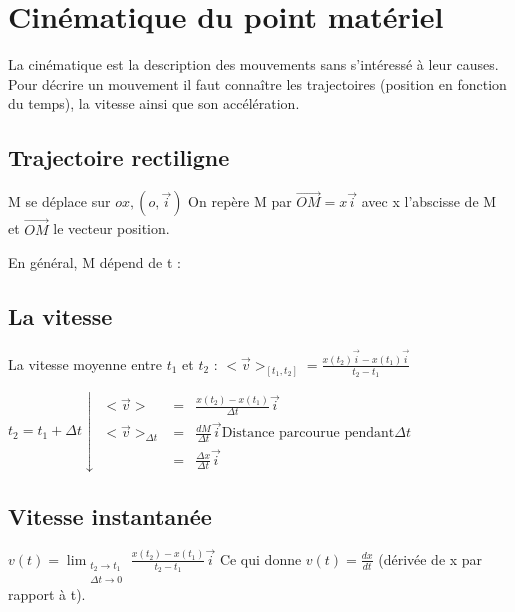 \chapter{Cinématique du point matériel}

La cinématique est la description des mouvements sans s'intéressé à leur causes.
Pour décrire un mouvement il faut connaître les trajectoires (position en fonction du temps), la vitesse ainsi que son accélération.

\section{Trajectoire rectiligne}


M se déplace sur $ox, (o, \vec{i})$ On repère M par $\overrightarrow{OM} = x\vec{i}$ avec x l'abscisse de M et $\overrightarrow{OM}$ le vecteur position.

En général, M dépend de t : 

\section{La vitesse}

La vitesse moyenne entre $t_1$ et $t_2$ : $<\vec{v}>_{[t_1, t_2]}= \frac{x(t_2)\vec{i} - x(t_1)\vec{i}}{t_2-t_1}$

$t_2=t_1+\Delta t \downarrow  \begin{array}{rcl} <\vec{v}> &=& \frac{x(t_2) - x(t_1)}{\Delta t} \vec{i} \\
<\vec{v}>_{\Delta t} &=& \frac{dM}{\Delta t} \vec{i} \text{Distance parcourue pendant} \Delta t \\
&=& \frac{\Delta x}{\Delta t}\vec{i}
\end{array}$

\section{Vitesse instantanée}

$v(t) = \lim_{\substack{t_2 \to t_1 \\ \Delta t \to 0}} \frac{x(t_2) - x(t_1)}{t_2 - t_1}\vec{i}$
	Ce qui donne $v(t) = \frac{dx}{dt}$ (dérivée de x par rapport à t).


